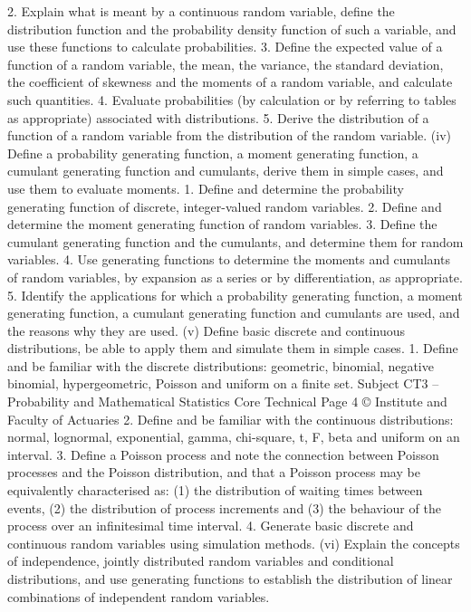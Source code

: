  2. Explain what is meant by a continuous random variable, define the distribution function and the probability density function of such a variable, and use these functions to calculate probabilities.  
 3. Define the expected value of a function of a random variable, the mean, the variance, the standard deviation, the coefficient of skewness and the moments of a random variable, and calculate such quantities.  
 4. Evaluate probabilities (by calculation or by referring to tables as appropriate) associated with distributions.  
 5. Derive the distribution of a function of a random variable from the distribution of the random variable.  
(iv) Define a probability generating function, a moment generating function, a cumulant generating function and cumulants, derive them in simple cases, and use them to evaluate moments.  
 1. Define and determine the probability generating function of discrete, integer-valued random variables.  
 2. Define and determine the moment generating function of random variables.  
 3. Define the cumulant generating function and the cumulants, and determine them for random variables.  
 4. Use generating functions to determine the moments and cumulants of random variables, by expansion as a series or by differentiation, as appropriate.  5. Identify the applications for which a probability generating function, a moment generating function, a cumulant generating function and cumulants are used, and the reasons why they are used.  
(v) Define basic discrete and continuous distributions, be able to apply them and simulate them in simple cases.  
 1. Define and be familiar with the discrete distributions: geometric, binomial, negative binomial, hypergeometric, Poisson and uniform on a finite set. 
Subject CT3 – Probability and Mathematical Statistics Core Technical   
Page 4 © Institute and Faculty of Actuaries 
 2. Define and be familiar with the continuous distributions: normal, lognormal, exponential, gamma, chi-square, t, F, beta and uniform on an interval.  
 3. Define a Poisson process and note the connection between Poisson processes and the Poisson distribution, and that a Poisson process may be equivalently characterised as: (1) the distribution of waiting times between events, (2) the distribution of process increments and (3) the behaviour of the process over an infinitesimal time interval.  
 4. Generate basic discrete and continuous random variables using simulation methods.  
(vi) Explain the concepts of independence, jointly distributed random variables and conditional distributions, and use generating functions to establish the distribution of linear combinations of independent random variables.  
